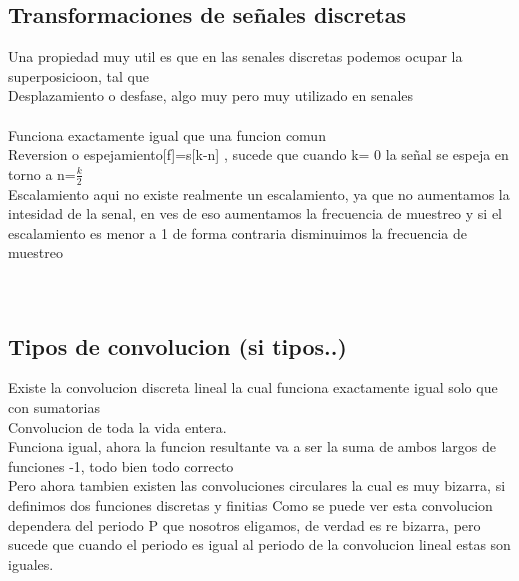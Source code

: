 \subsection {Transformaciones de señales discretas}
Una propiedad muy util es que en las senales discretas podemos ocupar la superposicioon, tal que \\
Desplazamiento o desfase, algo muy pero muy utilizado en senales \\\\  Funciona exactamente igual que una funcion comun
\\  Reversion o espejamiento[f]=s[k-n] , sucede que cuando k= 0 la señal se espeja en torno a n=$\frac{k}{2}$\\
Escalamiento aqui no existe realmente un escalamiento, ya que no aumentamos la intesidad de la senal, en ves de eso aumentamos la frecuencia de muestreo y si el escalamiento es menor a 1 de forma contraria disminuimos la frecuencia de muestreo
\\ \\ \\
\subsection{Tipos de convolucion (si tipos..)}
Existe la convolucion discreta lineal la cual funciona exactamente igual solo que con sumatorias
\\ Convolucion de toda la vida entera. \\
Funciona  igual, ahora la funcion resultante va a ser la suma de ambos largos de funciones -1, todo bien todo correcto\\
Pero ahora tambien existen las convoluciones circulares la cual es muy bizarra, si definimos dos funciones discretas y finitias
Como se puede ver esta convolucion dependera del periodo P que nosotros eligamos, de verdad es re bizarra, pero sucede que cuando el periodo es igual al periodo de la convolucion lineal estas son iguales.
\\\\
